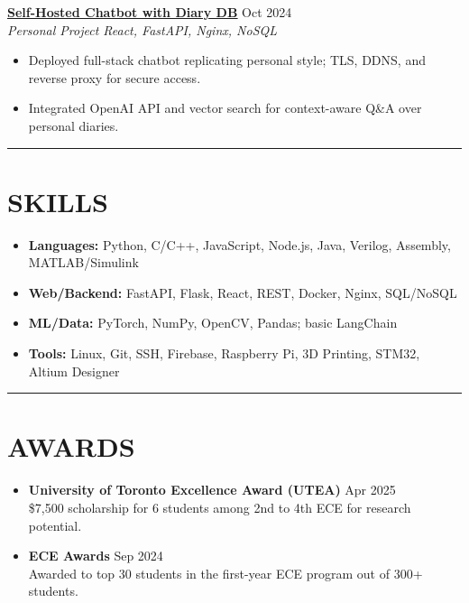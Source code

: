 \documentclass[letterpaper,10pt]{article}
\begin{document}
\vspace{0.2em}
\noindent\href{https://chengyongkang.me/chat}{\uline{\textbf{Self-Hosted Chatbot with Diary DB}}} \hfill Oct 2024\\
\textit{Personal Project \textbar{} React, FastAPI, Nginx, NoSQL}
\begin{itemize}
    \item Deployed full-stack chatbot replicating personal style; TLS, DDNS, and reverse proxy for secure access.
    \item Integrated OpenAI API and vector search for context-aware Q\&A over personal diaries.
\end{itemize}

\noindent\rule{\linewidth}{1pt}

\section*{\textbf{SKILLS}}
\begin{itemize}
    \item \textbf{Languages:} Python, C/C++, JavaScript, Node.js, Java, Verilog, Assembly, MATLAB/Simulink
    \item \textbf{Web/Backend:} FastAPI, Flask, React, REST, Docker, Nginx, SQL/NoSQL
    \item \textbf{ML/Data:} PyTorch, NumPy, OpenCV, Pandas; basic LangChain
    \item \textbf{Tools:} Linux, Git, SSH, Firebase, Raspberry Pi, 3D Printing, STM32, Altium Designer
\end{itemize}

\noindent\rule{\linewidth}{1pt}

\section*{\textbf{AWARDS}}

\begin{itemize}[leftmargin=0.2in]
	\item \textbf{University of Toronto Excellence Award (UTEA)} \hfill Apr 2025\\
    \$7,500 scholarship for 6 students among 2nd to 4th ECE for research potential.
	\item \textbf{ECE Awards} \hfill Sep 2024\\
	Awarded to top 30 students in the first-year ECE program out of 300+ students.
\end{itemize}
\end{document}
